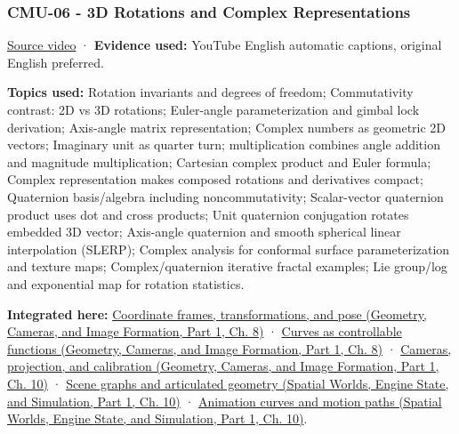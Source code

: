 \subsubsection{CMU-06 - 3D Rotations and Complex Representations}\label{04-visual-computing-ii-ch036-cmu-06---3d-rotations-and-complex-representations}

\hypertarget{04-visual-computing-ii-ch036-cmu-06---3d-rotations-and-complex-representations}{}

\href{https://www.youtube.com/watch?v=YF5ZUlKxSgE}{Source video} · \textbf{Evidence used:} YouTube English automatic captions, original English preferred.

\textbf{Topics used:} Rotation invariants and degrees of freedom; Commutativity contrast: 2D vs 3D rotations; Euler-angle parameterization and gimbal lock derivation; Axis-angle matrix representation; Complex numbers as geometric 2D vectors; Imaginary unit as quarter turn; multiplication combines angle addition and magnitude multiplication; Cartesian complex product and Euler formula; Complex representation makes composed rotations and derivatives compact; Quaternion basis/algebra including noncommutativity; Scalar-vector quaternion product uses dot and cross products; Unit quaternion conjugation rotates embedded 3D vector; Axis-angle quaternion and smooth spherical linear interpolation (SLERP); Complex analysis for conformal surface parameterization and texture maps; Complex/quaternion iterative fractal examples; Lie group/log and exponential map for rotation statistics.

\textbf{Integrated here:} \href{../03-Geometry-Cameras-and-Image-Formation-P01/main.pdf\#03-visual-computing-i-ch001-coordinate-frames-transformations-and-pose}{Coordinate frames, transformations, and pose (Geometry, Cameras, and Image Formation, Part 1, Ch. 8)} · \href{../03-Geometry-Cameras-and-Image-Formation-P01/main.pdf\#03-visual-computing-i-ch001-curves-as-controllable-functions}{Curves as controllable functions (Geometry, Cameras, and Image Formation, Part 1, Ch. 8)} · \href{../03-Geometry-Cameras-and-Image-Formation-P01/main.pdf\#03-visual-computing-i-ch003-cameras-projection-and-calibration}{Cameras, projection, and calibration (Geometry, Cameras, and Image Formation, Part 1, Ch. 10)} · \href{../05-Spatial-Worlds-Engine-State-and-Simulation-P01/main.pdf\#04-visual-computing-ii-ch029-scene-graphs-and-articulated-geometry}{Scene graphs and articulated geometry (Spatial Worlds, Engine State, and Simulation, Part 1, Ch. 10)} · \href{../05-Spatial-Worlds-Engine-State-and-Simulation-P01/main.pdf\#04-visual-computing-ii-ch029-animation-curves-and-motion-paths}{Animation curves and motion paths (Spatial Worlds, Engine State, and Simulation, Part 1, Ch. 10)}.


